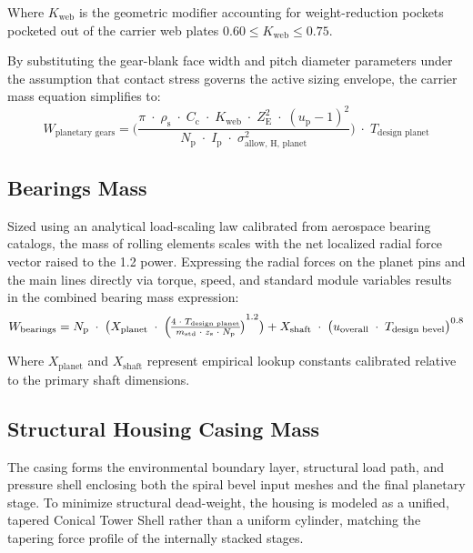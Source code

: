         Where $K_{\text{web}}$ is the geometric modifier accounting for weight-reduction pockets 
        pocketed out of the carrier web plates \(0.60 \leq K_{\text{web}} \leq 0.75\).
        
        By substituting the gear-blank face width and pitch diameter parameters under the assumption 
        that contact stress governs the active sizing envelope, the carrier mass equation simplifies to:
            \begin{equation}
                \label{eq:carriermassb}
                W_{\text{planetary gears}}
                =
                \bigl(\frac{\pi \;\cdot\; \rho_{\text{s}}
                \;\cdot\; C_{\text{c}}
                \;\cdot\; K_{\text{web}}
                \;\cdot\; Z_{\text{E}}^{2}
                \;\cdot\; {(u_{\text{p}}-1)}^{2}}
                {N_{\text{p}}\;\cdot\;I_{\text{p}}\;\cdot\;\sigma_{\text{allow, H, planet}}^{2}}
                \bigr)\;\cdot\; T_{\text{design planet}}
            \end{equation}

    \subsection{Bearings Mass}
        Sized using an analytical load-scaling law calibrated from aerospace bearing catalogs, the mass of 
        rolling elements scales with the net localized radial force vector raised to the 1.2 power. 
        Expressing the radial forces on the planet pins and the main lines directly via torque, speed, and 
        standard module variables results in the combined bearing mass expression:
            \begin{equation}
                \label{eq:bearingsmass}
                W_{\text{bearings}}
                = N_{\text{p}}\;\cdot\;
                \bigl(X_{\text{planet}}\;\cdot\;
                \bigl{(\frac{4\;\cdot\;T_{\text{design planet}}}
                {m_{\text{std}}\;\cdot\;z_{\text{s}}\;\cdot\;N_{\text{p}}}\bigr)}^{1.2}\bigr)
                + X_{\text{shaft}}\;\cdot\;
                \bigl{(u_{\text{overall}}\;\cdot\;T_{\text{design bevel}}\bigr)}^{0.8}
            \end{equation}
        
        Where $X_{\text{planet}}$ and $X_{\text{shaft}}$ represent empirical lookup constants calibrated 
        relative to the primary shaft dimensions.

    \subsection{Structural Housing Casing Mass}
        The casing forms the environmental boundary layer, structural load path, and pressure shell enclosing 
        both the spiral bevel input meshes and the final planetary stage. To minimize structural dead-weight, 
        the housing is modeled as a unified, tapered Conical Tower Shell rather than a uniform cylinder, 
        matching the tapering force profile of the internally stacked stages.

